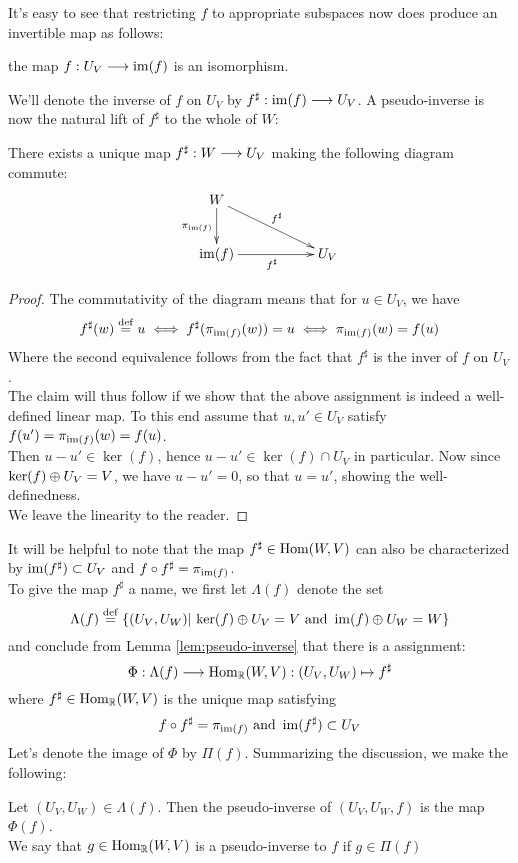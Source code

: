 \documentclass{dsp}
\begin{document}
It's easy to see that restricting $f$ to appropriate subspaces now does produce an invertible map as follows:

\begin{lemma}
	the map $f: U_V\longrightarrow \operatorname{im}(f)$ is an isomorphism.
\end{lemma}
\noindent We'll denote the inverse of $f$ on $U_V$ by $f^\sharp:\operatorname{im}(f)\longrightarrow U_V$. A pseudo-inverse is now the natural lift of $f^\sharp$ to the whole of $W$:


\begin{lemma}\label{lem:pseudo-inverse}
	There exists a unique map $f^\sharp:W\longrightarrow U_V$ making the following diagram commute:
	\begin{displaymath}
	\xymatrix{
	W\ar[d]_{\pi_{\im(f)}}\ar[drr]^{f^\sharp}\\
	\im(f)\ar[rr]_{f^\sharp} && U_V
	}
	\end{displaymath}
\end{lemma}

\begin{proof}
The commutativity of the diagram means that for $u \in U_V$, we have
\[
	f^\sharp(w) \stackrel{\operatorname{def}}{=} u\iff f^\sharp(\pi_{\operatorname{im}(f)}(w)) =u\iff \pi_{\operatorname{im}(f)}(w) =f(u)
\]
Where the second equivalence follows from the fact that $f^\sharp$ is the inver of $f$ on $U_V$.\\
The claim will thus follow if we show that the above assignment is indeed a well-defined linear map. To this end assume that $u,u' \in U_V$ satisfy $f(u')=\pi_{\operatorname{im}(f)}(w)=f(u)$.\\ Then $u-u' \in \ker(f)$, hence $u-u' \in \ker(f)\cap U_V$ in particular. Now since $\ker(f)\oplus U_V =V$, we have  $u-u'=0$, so that $u=u'$, showing the well-definedness.\\ 
We leave the linearity to the reader.
\end{proof}
It will be helpful to note that the map $f^\sharp\in \operatorname{Hom}(W,V)$ can also be characterized by $\operatorname{im}(f^\sharp)\subset U_V$ and $f\circ f^\sharp =\pi_{\operatorname{im}(f)}$.\\
To give the map $f^\sharp$ a name, we first let $\Lambda(f)$ denote the set
\[
\Lambda(f)\stackrel{\operatorname{def}}{=} \{(U_V,U_W)\vert \, \ker(f)\oplus U_V=V \textrm{ and } \operatorname{im}(f)\oplus U_W =W \}
\]
and conclude from Lemma \ref{lem:pseudo-inverse} that there is a assignment:
\[
\Phi: \Lambda(f)\longrightarrow \operatorname{Hom}_{\mathbb{R}}(W,V):(U_V,U_W)\mapsto f^\sharp
\]
where $f^\sharp \in \operatorname{Hom}_{\mathbb{R}}(W,V)$ is the unique map satisfying
\[
f \circ f^\sharp = \pi_{\operatorname{im}(f)} \textrm{ and } \operatorname{im}(f^\sharp)\subset U_V
\]
Let's denote the image of $\Phi$ by $\Pi(f)$. Summarizing the discussion, we make the following:
\begin{definition}\label{def:ps}
Let $(U_V,U_W) \in \Lambda(f)$. Then the pseudo-inverse of $(U_V,U_W,f)$ is the map $\Phi(f)$.\\
We say that $g\in \operatorname{Hom}_{\mathbb{R}}(W,V)$ is a pseudo-inverse to $f$ if $g\in \Pi(f)$
\end{definition}
\end{document}
